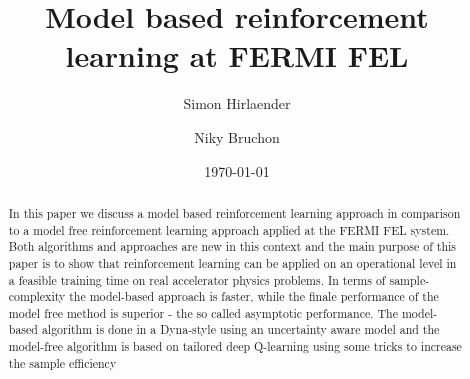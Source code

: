 \documentclass[
 reprint,
 amsmath,amssymb,amsfonts,clevref,
 aps,
prstab,
]{revtex4-2}
\begin{document}



\title{Model based reinforcement learning at FERMI FEL}



\author{Simon Hirlaender}
\author{Niky Bruchon}%

\date{\today}%


\begin{abstract}
In this paper we discuss a model based reinforcement learning approach in comparison to a model free reinforcement learning approach applied at the FERMI FEL system. Both algorithms and approaches are new in this context and the main purpose of this paper is to show that reinforcement learning can be applied on an operational level in a feasible training time on real accelerator physics problems. In terms of sample-complexity the model-based approach is faster, while the finale performance of the model free method is superior - the so called asymptotic performance. The model-based algorithm is done in a Dyna-style using an uncertainty aware model and the model-free algorithm is based on tailored deep Q-learning using some tricks to increase the sample efficiency
\end{abstract}
\maketitle

\end{document}

